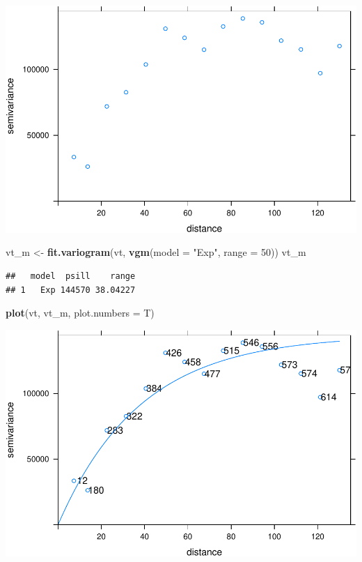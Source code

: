 \documentclass[11pt,]{article}
\newenvironment{Shaded}{\begin{snugshade}}{\end{snugshade}}
\newcommand{\KeywordTok}[1]{\textcolor[rgb]{0.13,0.29,0.53}{\textbf{#1}}}
\newcommand{\DataTypeTok}[1]{\textcolor[rgb]{0.13,0.29,0.53}{#1}}
\newcommand{\DecValTok}[1]{\textcolor[rgb]{0.00,0.00,0.81}{#1}}
\newcommand{\StringTok}[1]{\textcolor[rgb]{0.31,0.60,0.02}{#1}}
\newcommand{\NormalTok}[1]{#1}
\begin{document}
\includegraphics{proyecto_files/figure-latex/unnamed-chunk-55-1.pdf}

\begin{Shaded}
\begin{Highlighting}[]
\NormalTok{vt_m <-}\StringTok{ }\KeywordTok{fit.variogram}\NormalTok{(vt, }\KeywordTok{vgm}\NormalTok{(}\DataTypeTok{model =} \StringTok{"Exp"}\NormalTok{, }\DataTypeTok{range =} \DecValTok{50}\NormalTok{))}
\NormalTok{vt_m}
\end{Highlighting}
\end{Shaded}

\begin{verbatim}
##   model  psill    range
## 1   Exp 144570 38.04227
\end{verbatim}

\begin{Shaded}
\begin{Highlighting}[]
\KeywordTok{plot}\NormalTok{(vt, vt_m, }\DataTypeTok{plot.numbers =}\NormalTok{ T)}
\end{Highlighting}
\end{Shaded}

\includegraphics{proyecto_files/figure-latex/unnamed-chunk-55-2.pdf}
\end{document}
